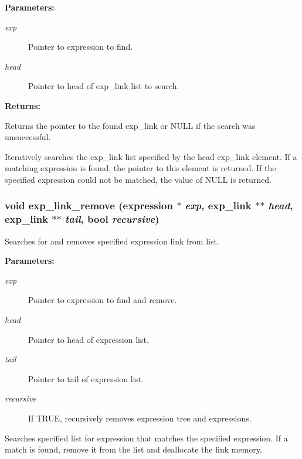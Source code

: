 \begin{Desc}
\item[{\bf Parameters: }]\par
\begin{description}
\item[
{\em exp}]Pointer to expression to find. \item[
{\em head}]Pointer to head of exp\_\-link list to search.

\end{description}
\end{Desc}
\begin{Desc}
\item[{\bf Returns: }]\par
Returns the pointer to the found exp\_\-link or NULL if the search was unsuccessful.

\end{Desc}
Iteratively searches the exp\_\-link list specified by the head exp\_\-link element. If a matching expression is found, the pointer to this element is returned. If the specified expression could not be matched, the value of NULL is returned. 
\subsubsection{\setlength{\rightskip}{0pt plus 5cm}void exp\_\-link\_\-remove ({\bf expression} $\ast$ {\em exp}, {\bf exp\_\-link} $\ast$$\ast$ {\em head}, {\bf exp\_\-link} $\ast$$\ast$ {\em tail}, {\bf bool} {\em recursive})}\label{link_8h_a17}


Searches for and removes specified expression link from list.

\begin{Desc}
\item[{\bf Parameters: }]\par
\begin{description}
\item[
{\em exp}]Pointer to expression to find and remove. \item[
{\em head}]Pointer to head of expression list. \item[
{\em tail}]Pointer to tail of expression list. \item[
{\em recursive}]If TRUE, recursively removes expression tree and expressions.

\end{description}
\end{Desc}
Searches specified list for expression that matches the specified expression. If a match is found, remove it from the list and deallocate the link memory. 
